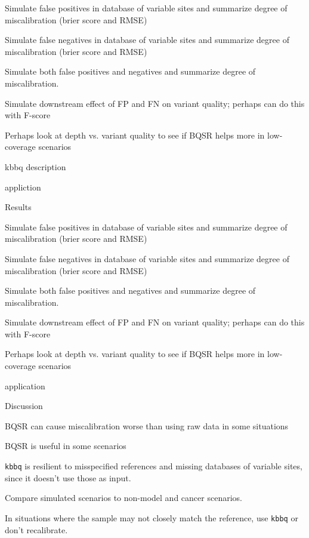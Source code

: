 \documentclass{article}
\begin{document}
\begin{outline}
\begin{outline}
		\item Simulate false positives in database of variable sites and summarize degree of miscalibration (brier score and RMSE)
		\item Simulate false negatives in database of variable sites and summarize degree of miscalibration (brier score and RMSE)
		\item Simulate both false positives and negatives and summarize degree of miscalibration.
		\item Simulate downstream effect of FP and FN on variant quality; perhaps can do this with F-score
		\item Perhaps look at depth vs. variant quality to see if BQSR helps more in low-coverage scenarios
		\item kbbq description
		\item appliction
	\end{outline}
	\item Results
	\begin{outline}
		\item Simulate false positives in database of variable sites and summarize degree of miscalibration (brier score and RMSE)
		\item Simulate false negatives in database of variable sites and summarize degree of miscalibration (brier score and RMSE)
		\item Simulate both false positives and negatives and summarize degree of miscalibration.
		\item Simulate downstream effect of FP and FN on variant quality; perhaps can do this with F-score
		\item Perhaps look at depth vs. variant quality to see if BQSR helps more in low-coverage scenarios
		\item application
	\end{outline}
	\item Discussion
	\begin{outline}
		\item BQSR can cause miscalibration worse than using raw data in some situations
		\item BQSR is useful in some scenarios
		\item \texttt{kbbq} is resilient to misspecified references and missing databases of variable sites, since it doesn't use those as input.
		\item Compare simulated scenarios to non-model and cancer scenarios.
		\begin{outline}
			\item In situations where the sample may not closely match the reference, use \texttt{kbbq} or don't recalibrate.
		\end{outline}
	\end{outline}
\end{outline}
\end{document}
